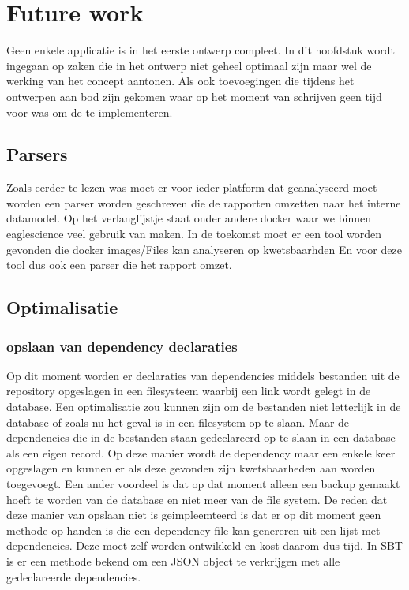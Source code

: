 
\chapter{Future work}\label{ch:name} %
Geen enkele applicatie is in het eerste ontwerp compleet. In dit hoofdstuk wordt ingegaan op zaken die in het ontwerp niet geheel optimaal zijn maar wel de werking van het concept aantonen.
Als ook toevoegingen die tijdens het ontwerpen aan bod zijn gekomen waar op het moment van schrijven geen tijd voor was om de te implementeren.


\section{Parsers}\label{sec:parsers}
Zoals eerder te lezen was moet er voor ieder platform dat geanalyseerd moet worden een parser worden geschreven die de rapporten omzetten naar het interne datamodel.
Op het verlanglijstje staat onder andere docker waar we binnen eaglescience veel gebruik van maken. In de toekomst moet er een tool worden gevonden die docker images/Files kan analyseren op kwetsbaarhden En voor deze tool dus ook een parser die het rapport omzet.

\section{Optimalisatie}\label{sec:optimalisatie}

\subsection{opslaan van dependency declaraties}\label{subsec:opslaan-van-dependency-declaraties}
Op dit moment worden er declaraties van dependencies middels bestanden uit de repository opgeslagen in een filesysteem waarbij een link wordt gelegt in de database. Een optimalisatie zou kunnen zijn om de bestanden niet letterlijk in de database of zoals nu het geval is in een filesystem op te slaan. Maar de dependencies die in de bestanden staan gedeclareerd op te slaan in een database als een eigen record. Op deze manier wordt de dependency maar een enkele keer opgeslagen en kunnen er als deze gevonden zijn kwetsbaarheden aan worden toegevoegt. Een ander voordeel is dat op dat moment alleen een backup gemaakt hoeft te worden van de database en niet meer van de file system. De reden dat deze manier van opslaan niet is geimpleemteerd is dat er op dit moment geen methode op handen is die een dependency file kan genereren uit een lijst met dependencies. Deze moet zelf worden ontwikkeld en kost daarom dus tijd. In SBT is er een methode bekend om een JSON object te verkrijgen met alle gedeclareerde dependencies.


